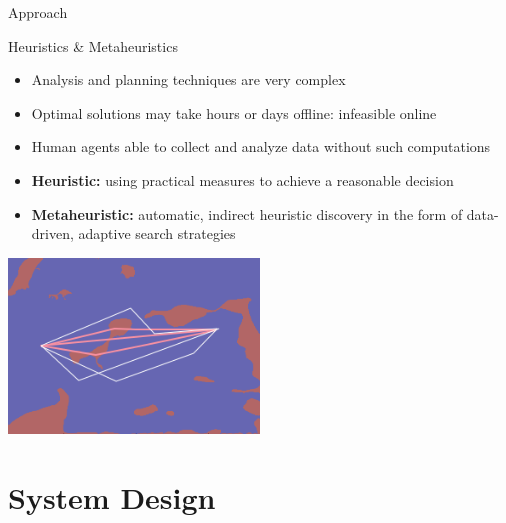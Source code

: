 \documentclass[9pt]{beamer}
\begin{document}
\begin{frame}{Approach}
    \begin{block}{Heuristics \& Metaheuristics}
        \begin{itemize}
	        \item Analysis and planning techniques are very complex
    	    \item Optimal solutions may take hours or days offline: infeasible online
            \item Human agents able to collect and analyze data without such computations
	        \item \textbf{Heuristic:} using practical measures to achieve a reasonable decision
	        \item \textbf{Metaheuristic:} automatic, indirect heuristic discovery in the form of data-driven, adaptive search strategies
        \end{itemize}
        \begin{center}
            \includegraphics[width=0.5\textwidth,trim={0cm 0cm 0cm 0cm},clip]{img/metaheuristics.png}
        \end{center}
    \end{block}
\end{frame}


\section{System Design}
\end{document}
